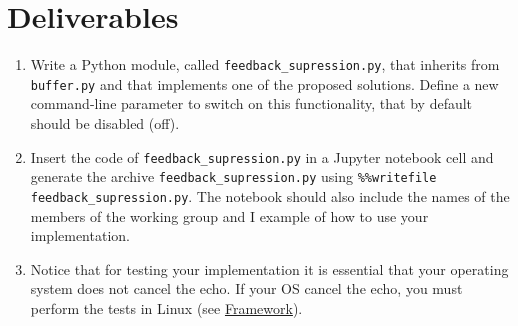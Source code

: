\section{Deliverables}

\begin{enumerate}
\item Write a Python module, called \texttt{feedback\_supression.py},
  that inherits from \texttt{buffer.py} and that implements one of the
  proposed solutions. Define a new command-line parameter to switch on
  this functionality, that by default should be disabled (off).
\item Insert the code of \texttt{feedback\_supression.py} in a Jupyter
  notebook cell and generate the archive
  \texttt{feedback\_supression.py} using \texttt{\%\%writefile
    feedback\_supression.py}. The notebook should also include the
  names of the members of the working group and I example of how to
  use your implementation.
\item Notice that for testing your implementation it is essential that
  your operating system does not cancel the echo. If your OS cancel
  the echo, you must perform the tests in Linux (see
  \href{https://tecnologias-multimedia.github.io/contents/framework/}{Framework}).
\end{enumerate}

